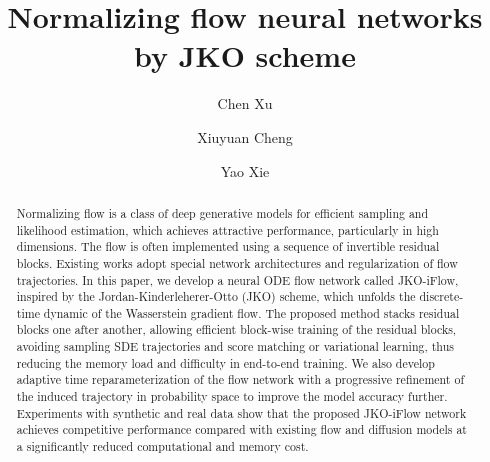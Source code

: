 \documentclass{article}
\theoremstyle{remark}
\theoremstyle{plain}
\begin{document}
\title{Normalizing flow neural networks by JKO scheme}

\author[1]{Chen Xu}
\author[2]{Xiuyuan Cheng}
\author[1]{Yao Xie}


\date{
}


\maketitle


\begin{abstract}
Normalizing flow is a class of deep generative models for efficient sampling and likelihood estimation, which achieves attractive performance, particularly in high dimensions. The flow is often implemented using a sequence of invertible residual blocks. Existing works adopt special network architectures and regularization of flow trajectories. In this paper, we develop a neural ODE flow network called JKO-iFlow, inspired by the Jordan-Kinderleherer-Otto (JKO) scheme, which unfolds the discrete-time dynamic of the Wasserstein gradient flow. The proposed method stacks residual blocks one after another, allowing efficient block-wise training of the residual blocks, avoiding sampling SDE trajectories and score matching or variational learning, thus reducing the memory load and difficulty in end-to-end training. We also develop adaptive time reparameterization of the flow network with a progressive refinement of the induced trajectory in probability space to improve the model accuracy further. Experiments with synthetic and real data show that the proposed JKO-iFlow network achieves competitive performance compared with existing flow and diffusion models at a significantly reduced computational and memory cost. 
\end{abstract}
\end{document}
